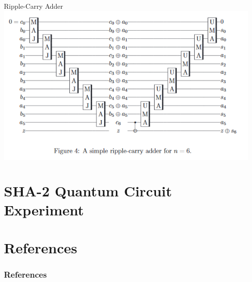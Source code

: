 \documentclass{beamer}
\begin{document}
    \begin{frame}{Ripple-Carry Adder}
    	\includegraphics[width=\textwidth]{./Images/ripple-carry-adder.jpg}
    \end{frame}
    
    \section{SHA-2 Quantum Circuit Experiment}
    
    
    \section{References}
    \begin{frame}[allowframebreaks]
        \frametitle{References}
        
        
    \end{frame}
\end{document}
